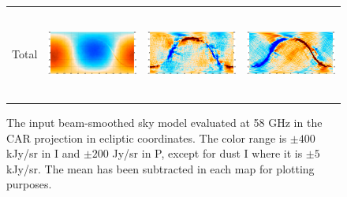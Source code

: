 \documentclass{article}
\begin{document}
\begin{figure}
\begin{tabular}{rm{56mm}m{54.4mm}m{56mm}}
		Total &
		\includegraphics[height=29.7mm,clip,trim=0 0mm 7.5mm 0]{plots/sim_freqmap_58GHz_0_0.png} &
		\includegraphics[height=29.7mm,clip,trim=7.5mm 0mm 7.5mm 0]{plots/sim_freqmap_58GHz_0_1.png} &
		\includegraphics[height=29.7mm,clip,trim=7.5mm 0mm 0 0]{plots/sim_freqmap_58GHz_0_2.png}
	\end{tabular}
	\caption{The input beam-smoothed sky model evaluated at 58 GHz in the CAR
	projection in ecliptic coordinates. The color range is
	$\pm 400$ kJy/sr in I and $\pm 200$ Jy/sr in P, except for dust I where it is
	$\pm 5$ kJy/sr. The mean has been subtracted in each map for plotting purposes.}
\end{figure}
\end{document}
